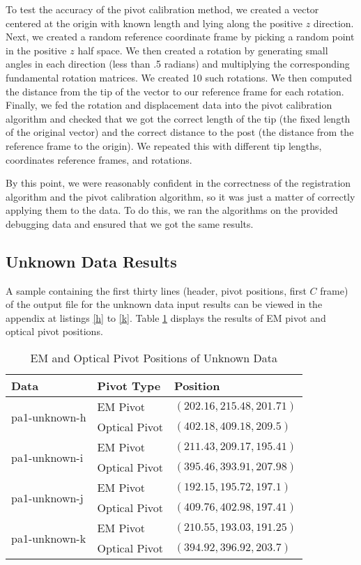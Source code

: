 \documentclass[12pt,letterpaper]{scrartcl}
\begin{document}
    To test the accuracy of the pivot calibration method, we created a vector centered at the origin with known length and lying along the positive $z$ direction. Next, we created a random reference coordinate frame by picking a random point in the positive $z$ half space. We then created a rotation by generating small angles in each direction (less than .5 radians) and multiplying the corresponding fundamental rotation matrices. We created 10 such rotations. We then computed the distance from the tip of the vector to our reference frame for each rotation. Finally, we fed the rotation and displacement data into the pivot calibration algorithm and checked that we got the correct length of the tip (the fixed length of the original vector) and the correct distance to the post (the distance from the reference frame to the origin). We repeated this with different tip lengths, coordinates reference frames, and rotations.
        
    By this point, we were reasonably confident in the correctness of the registration algorithm and the pivot calibration algorithm, so it was just a matter of correctly applying them to the data. To do this, we ran the algorithms on the provided debugging data and ensured that we got the same results. 
    \subsection{Unknown Data Results}
    A sample containing the first thirty lines (header, pivot positions, first $C$ frame) of the output file for the unknown data input results can be viewed in the appendix at listings \ref{h} to \ref{k}.
    Table \ref{tab:unknown} displays the results of EM pivot and optical pivot positions.
    \begin{table}[]
\centering
\caption{EM and Optical Pivot Positions of Unknown Data}
\label{tab:unknown}
%
\begin{tabular}{@{}lll@{}}
\toprule
\textbf{Data}                  & \textbf{Pivot Type} & \textbf{Position}          \\ \midrule
\multirow{2}{*}{pa1-unknown-h} & EM Pivot            & $(202.16, 215.48, 201.71)$ \\
                               & Optical Pivot       & $(402.18, 409.18, 209.5)$  \\
\multirow{2}{*}{pa1-unknown-i} & EM Pivot            & $(211.43, 209.17, 195.41)$ \\
                               & Optical Pivot       & $(395.46, 393.91, 207.98)$ \\
\multirow{2}{*}{pa1-unknown-j} & EM Pivot            & $(192.15, 195.72, 197.1)$  \\
                               & Optical Pivot       & $(409.76, 402.98, 197.41)$ \\
\multirow{2}{*}{pa1-unknown-k} & EM Pivot            & $(210.55, 193.03, 191.25)$ \\
                               & Optical Pivot       & $(394.92, 396.92, 203.7)$  \\ \bottomrule 
\end{tabular}%

\end{table}
\end{document}
